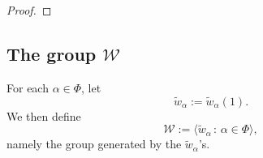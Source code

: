 \documentclass[10pt, letterpaper]{amsart}
\theoremstyle{plain}
\theoremstyle{definition}
\numberwithin{equation}{section}
\newcommand{\Z}{\mathbb{Z}}
\newcommand{\wta}{\tilde{w}_{\alpha}}
\newcommand{\alphac}{{\check{\alpha}}}
\newcommand{\Yt}{\widetilde{Y}}
\newcommand{\Wcal}{\mathcal{W}}
\newcommand{\la}{\langle}
\newcommand{\ra}{\rangle}
\newcommand{\st}{\,:\,}
\begin{document}
\begin{proof}

\end{proof}



\subsection{The group $\Wcal$}

For each $\alpha\in\Phi$, let
\[
\wta:=\wta(1).
\]
We then define
\begin{equation}\label{E:definition_of_Wcal}
\Wcal:=\la \wta\st\alpha\in\Phi\ra,
\end{equation}
namely the group generated by the $\wta$'s.
\end{document}
